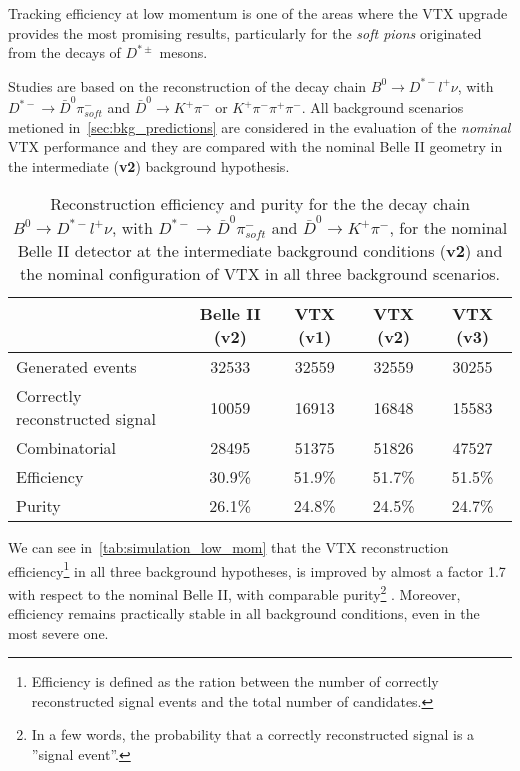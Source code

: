 Tracking efficiency at low momentum is one of the areas where the VTX upgrade provides the most promising results, particularly for the \textit{soft pions} originated from the decays of $D^{*\pm}$ mesons.

Studies are based on the reconstruction of the decay chain $B^{0} \rightarrow D^{*-}l^{+}\nu$, with $D^{*-} \rightarrow \bar{D}^{0} \pi^{-}_{soft}$ and $\bar{D}^{0} \rightarrow K^{+} \pi^{-}$ or $K^{+} \pi^{-} \pi^{+} \pi^{-}$. All background scenarios metioned in~\autoref{sec:bkg_predictions} are considered in the evaluation of the \textit{nominal} VTX performance and they are compared with the nominal Belle II geometry in the intermediate (\textbf{v2}) background hypothesis.


\begin{table}[htbp]
  \begin{center}
    \begin{tabular}{l|c|c|c|c}
      \hline\hline
      & Belle II (v2) & VTX (v1) & VTX (v2) & VTX (v3) \\
      \hline\hline
      Generated events & 32533 & 32559 & 32559 & 30255 \\
      \hline
      Correctly reconstructed signal & 10059 & 16913 & 16848 & 15583 \\
      \hline
      Combinatorial & 28495 & 51375 & 51826 & 47527 \\
      \hline\hline
      Efficiency & 30.9\% & 51.9\% & 51.7\% & 51.5\% \\
      \hline
      Purity & 26.1\% & 24.8\% & 24.5\% & 24.7\% \\
      \hline\hline
    \end{tabular}
  \end{center}
   \caption{Reconstruction efficiency and purity for the the decay chain $B^{0} \rightarrow D^{*-}l^{+}\nu$, with $D^{*-} \rightarrow \bar{D}^{0} \pi^{-}_{soft}$ and $\bar{D}^{0} \rightarrow K^{+} \pi^{-}$, for the nominal Belle II detector at the intermediate background conditions (\textbf{v2}) and the nominal configuration of VTX in all three background scenarios.}
\label{tab:simulation_low_mom}
\end{table}


We can see in~\autoref{tab:simulation_low_mom} that the VTX reconstruction efficiency\footnote{Efficiency is defined as the ration between the number of correctly reconstructed signal events and the total number of candidates.}  in all three background hypotheses, is improved by almost a factor 1.7 with respect to the nominal Belle II, with comparable purity\footnote{In a few words, the probability that a correctly reconstructed signal  is a ''signal event''.} . Moreover, efficiency remains practically stable in all background conditions, even in the most severe one.

